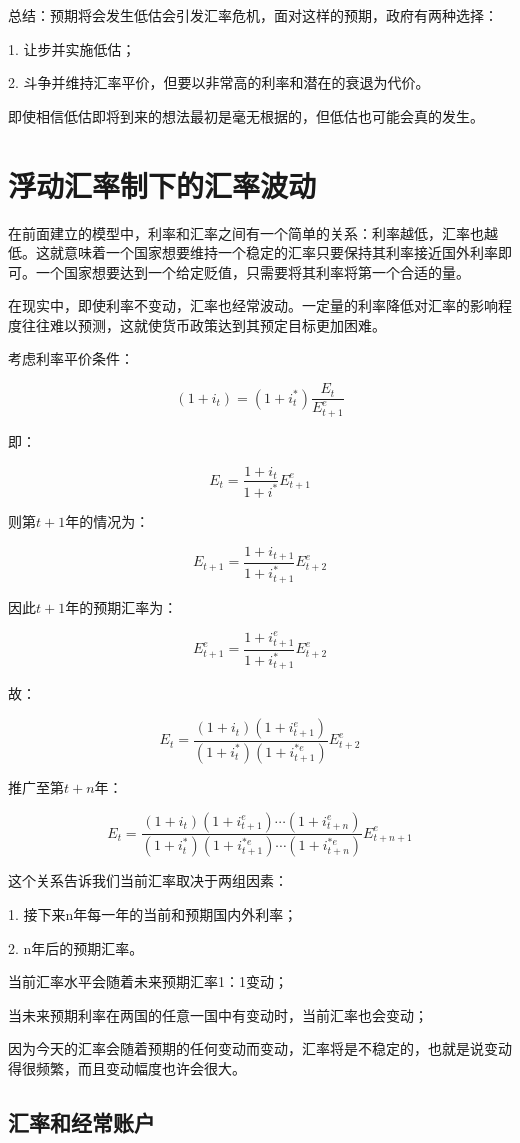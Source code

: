 \documentclass{article}
\begin{document}
总结：预期将会发生低估会引发汇率危机，面对这样的预期，政府有两种选择：

1. 让步并实施低估；

2. 斗争并维持汇率平价，但要以非常高的利率和潜在的衰退为代价。

即使相信低估即将到来的想法最初是毫无根据的，但低估也可能会真的发生。

\section{浮动汇率制下的汇率波动}

在前面建立的模型中，利率和汇率之间有一个简单的关系：利率越低，汇率也越低。这就意味着一个国家想要维持一个稳定的汇率只要保持其利率接近国外利率即可。一个国家想要达到一个给定贬值，只需要将其利率将第一个合适的量。

在现实中，即使利率不变动，汇率也经常波动。一定量的利率降低对汇率的影响程度往往难以预测，这就使货币政策达到其预定目标更加困难。

考虑利率平价条件：

\[
(1+i_t)=(1+i^*_t)\frac{E_t}{E^e_{t+1}}
\]

即：

\[
E_t=\frac{1+i_t}{1+i^*}E^e_{t+1}
\]

则第$ t+1 $年的情况为：

\[
E_{t+1}=\frac{1+i_{t+1}}{1+i^*_{t+1}}E^e_{t+2}
\]

因此$ t+1 $年的预期汇率为：

\[
E_{t+1}^e=\frac{1+i_{t+1}^e}{1+i^*_{t+1}}E^e_{t+2}
\]

故：

\[
E_t=\frac{(1+i_t)(1+i^e_{t+1})}{(1+i^*_t)(1+i^{*e}_{t+1})}E^e_{t+2}
\]

推广至第$ t+n $年：

\[
E_t=\frac{(1+i_t)(1+i^e_{t+1})\cdots(1+i^e_{t+n})}{(1+i^*_t)(1+i^{*e}_{t+1})\cdots(1+i^{*e}_{t+n})}E^e_{t+n+1}
\]

这个关系告诉我们当前汇率取决于两组因素：

1. 接下来n年每一年的当前和预期国内外利率；

2. n年后的预期汇率。

当前汇率水平会随着未来预期汇率1：1变动；

当未来预期利率在两国的任意一国中有变动时，当前汇率也会变动；

因为今天的汇率会随着预期的任何变动而变动，汇率将是不稳定的，也就是说变动得很频繁，而且变动幅度也许会很大。

\subsection{汇率和经常账户}
\end{document}
